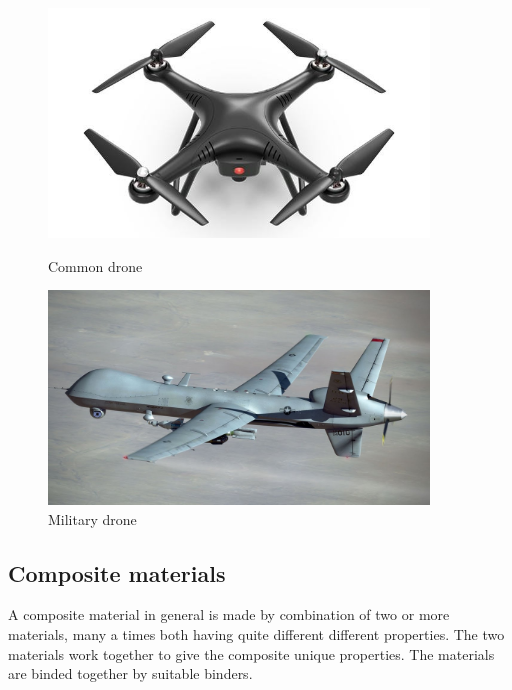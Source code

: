 \documentclass{article}
\begin{document}
\begin{figure}
    \centering
    \begin{minipage}{0.45\textwidth}
        \centering
        \includegraphics[width=0.9\textwidth]{drone.jpg} %
        \caption{Common drone}
        \label{fig:drone}
    \end{minipage}\hfill
    \begin{minipage}{0.45\textwidth}
        \centering
        \includegraphics[width=0.9\textwidth]{drone2.jpg} %
        \caption{Military drone}
        \label{fig:drone2}
    \end{minipage}
\end{figure}

\subsection{Composite materials}

A composite material in general is made by combination of two or more materials, many a times both having quite different  different properties. The two materials work together to give the composite unique properties. The materials are binded together by suitable binders. 
\end{document}
